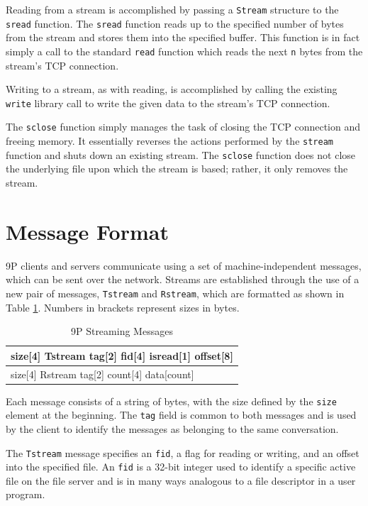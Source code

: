 \documentclass[11pt,american]{report}
\begin{document}
Reading from a stream is accomplished by passing a {\tt Stream} structure to the {\tt sread} function. The {\tt sread} function reads up to the specified number of bytes from the stream and stores them into the specified buffer. This function is in fact simply a call to the standard {\tt read} function which reads the next {\tt n} bytes from the stream's TCP connection.

Writing to a stream, as with reading, is accomplished by calling the existing {\tt write} library call to write the given data to the stream's TCP connection.

The {\tt sclose} function simply manages the task of closing the TCP connection and freeing memory. It essentially reverses the actions performed by the {\tt stream} function and shuts down an existing stream. The {\tt sclose} function does not close the underlying file upon which the stream is based; rather, it only removes the stream.

\section{Message Format}

9P clients and servers communicate using a set of machine-independent messages, which can be sent over the network. Streams are established through the use of a new pair of messages, {\tt Tstream} and {\tt Rstream}, which are formatted as shown in Table \ref{table:9pmessages}. Numbers in brackets represent sizes in bytes.

\begin{table}[h]
	\caption{9P Streaming Messages}
	\begin{center}
		\begin{tabular}{ | l | }
			\hline
			size[4] Tstream tag[2] fid[4] isread[1] offset[8] \\ \hline
			size[4] Rstream tag[2] count[4] data[count] \\ \hline
		\end{tabular}
	\end{center}
	\label{table:9pmessages}
\end{table}

Each message consists of a string of bytes, with the size defined by the {\tt size} element at the beginning. The {\tt tag} field is common to both messages and is used by the client to identify the messages as belonging to the same conversation.

The {\tt Tstream} message specifies an {\tt fid}, a flag for reading or writing, and an offset into the specified file. An {\tt fid} is a 32-bit integer used to identify a specific active file on the file server and is in many ways analogous to a file descriptor in a user program.
\end{document}
